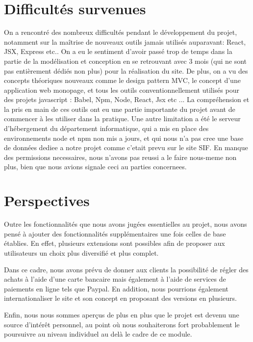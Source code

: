 \documentclass[a4paper,12pt]{report}
\theoremstyle{break}
\theoremstyle{break}
\theoremstyle{break}
\theoremstyle{break}
\theoremstyle{definition}
\theoremstyle{remark}
\begin{document}
\section{Difficultés survenues}
On a rencontré des nombreux difficultés pendant le développement du projet, notamment sur la maîtrise de
nouveaux outils jamais utilisés auparavant: React, JSX, Express etc..
On a eu le sentiment d'avoir passé trop de temps dans la partie de la modélisation et conception en se retrouvant
avec 3 mois (qui ne sont pas entièrement dédiés non plus) pour la réalisation du site.
De plus, on a vu des concepts théoriques nouveaux comme le design pattern MVC, le concept d'une application web monopage,
et tous les outils conventionnellement utilisés pour des projets javascript : Babel, Npm, Node, React, Jsx etc ...
La compréhension et la pris en main de ces outils ont eu une partie importante du projet avant de commencer à les utiliser dans la pratique.
Une autre limitation a été le serveur d'hébergement du département informatique, qui a mis en place des environnements node et npm non mis a jours,
et qui nous n’a pas cree une base de données  dediee a notre projet comme c’etait prevu sur le site SIF. En manque des permissions necessaires, nous n’avons pas reussi a le faire nous-meme non plus, bien que nous avions signale ceci au parties concernees.
\section{Perspectives}
\label{sec:perspectives}
Outre les fonctionnalités que nous avons jugées essentielles au projet, nous avons pensé à ajouter des fonctionnalités supplémentaires une fois celles de base établies. En effet, plusieurs extensions sont possibles afin de proposer aux utilisateurs un choix plus diversifié et plus complet.

Dans ce cadre, nous avons prévu de donner aux clients la possibilité de régler des achats à l'aide d'une carte bancaire mais également à l'aide de services de paiements en ligne tels que Paypal. En addition, nous pourrions également internationaliser le site et son concept en proposant des versions
en plusieurs.

Enfin, nous nous sommes aperçus de plus en plus que le projet est devenu une source d'intérêt personnel, au point où nous souhaiterons fort probablement le poursuivre au niveau individuel au delà le cadre de ce module.
\end{document}
